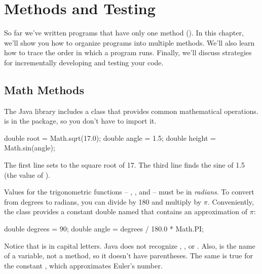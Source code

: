 \chapter{Methods and Testing}

So far we've written programs that have only one method ().
In this chapter, we'll show you how to organize programs into multiple methods.
We'll also learn how to trace the order in which a program runs.
Finally, we'll discuss strategies for incrementally developing and testing your code.



\section{Math Methods}



The Java library includes a  class that provides common mathematical operations.
 is in the  package, so you don't have to import it.

\begin{code}
double root = Math.sqrt(17.0);
double angle = 1.5;
double height = Math.sin(angle);
\end{code}

The first line sets  to the square root of 17.
The third line finds the sine of 1.5 (the value of ).


Values for the trigonometric functions -- , , and  -- must be in {\em radians}.
To convert from degrees to radians, you can divide by 180 and multiply by $\pi$.
Conveniently, the  class provides a constant double named  that contains an approximation of $\pi$:

\begin{code}
double degrees = 90;
double angle = degrees / 180.0 * Math.PI;
\end{code}

Notice that  is in capital letters.
Java does not recognize , , or .
Also,  is the name of a variable, not a method, so it doesn't have parentheses.
The same is true for the constant , which approximates Euler's number.

